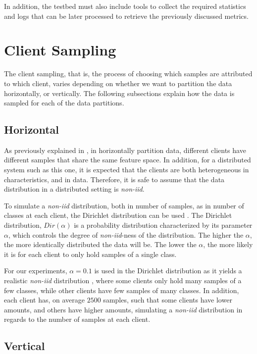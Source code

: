 In addition, the testbed must also include tools to collect the required statistics and logs that can be later processed to retrieve the previously discussed metrics.

\section{Client Sampling}\label{meth:client_sampling}

The client sampling, that is, the process of choosing which samples are attributed to which client, varies depending on whether we want to partition the data horizontally, or vertically. The following subsections explain how the data is sampled for each of the data partitions.

\subsection{Horizontal}

As previously explained in , in horizontally partition data, different clients have different samples that share the same feature space. In addition, for a distributed system such as this one, it is expected that the clients are both heterogeneous in characteristics, and in data. Therefore, it is safe to assume that the data distribution in a distributed setting is \textit{non-iid}.

To simulate a \textit{non-iid} distribution, both in number of samples, as in number of classes at each client, the Dirichlet distribution can be used \cite{tim, 10.48550/arxiv.2006.07242}. The Dirichlet distribution, $Dir(\alpha)$ is a probability distribution characterized by its parameter $\alpha$, which controls the degree of \textit{non-iid}-ness of the distribution. The higher the $\alpha$, the more identically distributed the data will be. The lower the $\alpha$, the more likely it is for each client to only hold samples of a single class.

For our experiments, $\alpha = 0.1$ is used in the Dirichlet distribution as it yields a realistic \textit{non-iid} distribution \cite{10.48550/arxiv.2006.07242}, where some clients only hold many samples of a few classes, while other clients have few samples of many classes. In addition, each client has, on average $2500$ samples, such that some clients have lower amounts, and others have higher amounts, simulating a \textit{non-iid} distribution in regards to the number of samples at each client.

\subsection{Vertical}\label{subsection:verticalpartitioning}

